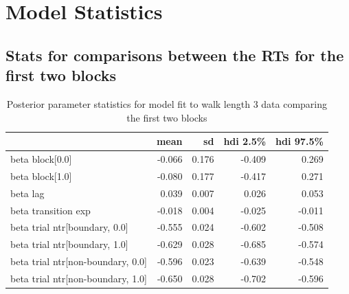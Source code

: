\section{Model Statistics}

\subsection*{Stats for comparisons between the RTs for the first two blocks}

\begin{table}[H]
    \centering
    \begin{tabular}{lrrrr}
        \toprule
         & mean & sd & hdi 2.5\% & hdi 97.5\% \\
        \midrule
        beta block[0.0] & -0.066 & 0.176 & -0.409 & 0.269 \\
        beta block[1.0] & -0.080 & 0.177 & -0.417 & 0.271 \\
        beta lag & 0.039 & 0.007 & 0.026 & 0.053 \\
        beta transition exp & -0.018 & 0.004 & -0.025 & -0.011 \\
        beta trial ntr[boundary, 0.0] & -0.555 & 0.024 & -0.602 & -0.508 \\
        beta trial ntr[boundary, 1.0] & -0.629 & 0.028 & -0.685 & -0.574 \\
        beta trial ntr[non-boundary, 0.0] & -0.596 & 0.023 & -0.639 & -0.548 \\
        beta trial ntr[non-boundary, 1.0] & -0.650 & 0.028 & -0.702 & -0.596 \\
        \bottomrule
        \end{tabular}        
        \caption{Posterior parameter statistics for model fit to walk length 3 data comparing the first two blocks}
        \label{tab:first-two-blocks-3}
\end{table}

